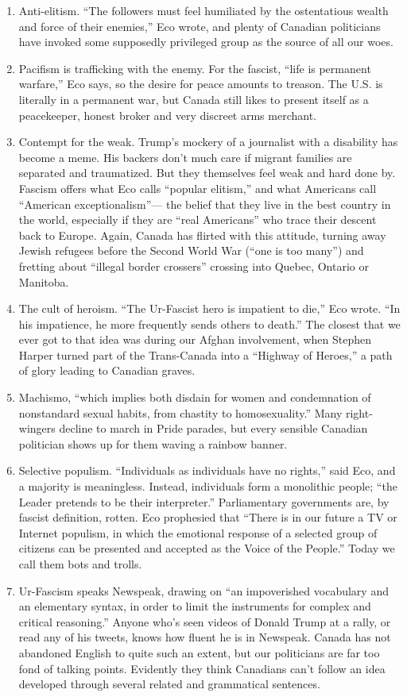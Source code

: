\documentclass[
]{book}
\begin{document}
\begin{enumerate}
\item
  Anti-elitism. ``The followers must feel humiliated by the ostentatious wealth and force of their enemies,'' Eco wrote, and plenty of Canadian politicians have invoked some supposedly privileged group as the source of all our woes.
\item
  Pacifism is trafficking with the enemy. For the fascist, ``life is permanent warfare,'' Eco says, so the desire for peace amounts to treason. The U.S. is literally in a permanent war, but Canada still likes to present itself as a peacekeeper, honest broker and very discreet arms merchant.
\item
  Contempt for the weak. Trump's mockery of a journalist with a disability has become a meme. His backers don't much care if migrant families are separated and traumatized. But they themselves feel weak and hard done by. Fascism offers what Eco calls ``popular elitism,'' and what Americans call ``American exceptionalism''--- the belief that they live in the best country in the world, especially if they are ``real Americans'' who trace their descent back to Europe. Again, Canada has flirted with this attitude, turning away Jewish refugees before the Second World War (``one is too many'') and fretting about ``illegal border crossers'' crossing into Quebec, Ontario or Manitoba.
\item
  The cult of heroism. ``The Ur-Fascist hero is impatient to die,'' Eco wrote. ``In his impatience, he more frequently sends others to death.'' The closest that we ever got to that idea was during our Afghan involvement, when Stephen Harper turned part of the Trans-Canada into a ``Highway of Heroes,'' a path of glory leading to Canadian graves.
\item
  Machismo, ``which implies both disdain for women and condemnation of nonstandard sexual habits, from chastity to homosexuality.'' Many right-wingers decline to march in Pride parades, but every sensible Canadian politician shows up for them waving a rainbow banner.
\item
  Selective populism. ``Individuals as individuals have no rights,'' said Eco, and a majority is meaningless. Instead, individuals form a monolithic people; ``the Leader pretends to be their interpreter.'' Parliamentary governments are, by fascist definition, rotten. Eco prophesied that ``There is in our future a TV or Internet populism, in which the emotional response of a selected group of citizens can be presented and accepted as the Voice of the People.'' Today we call them bots and trolls.
\item
  Ur-Fascism speaks Newspeak, drawing on ``an impoverished vocabulary and an elementary syntax, in order to limit the instruments for complex and critical reasoning.'' Anyone who's seen videos of Donald Trump at a rally, or read any of his tweets, knows how fluent he is in Newspeak. Canada has not abandoned English to quite such an extent, but our politicians are far too fond of talking points. Evidently they think Canadians can't follow an idea developed through several related and grammatical sentences.
\end{enumerate}
\end{document}
